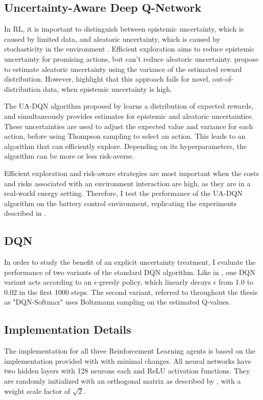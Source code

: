 \subsection{Uncertainty-Aware Deep Q-Network} %
In RL, it is important to distinguish between epistemic uncertainty, which is caused by limited data, and aleatoric uncertainty, which is caused by stochasticity in the environment \citep{hullermeier2021AleatoricEpistemicUncertainty}.
Efficient exploration aims to reduce epistemic uncertainty for promising actions, but can't reduce aleatoric uncertainty.
\cite{nikolov2022InformationDirectedExplorationDeep} propose to estimate aleatoric uncertainty using the variance of the estimated reward distribution.
However, \cite{chua2018DeepReinforcementLearning} highlight that this approach fails for novel, out-of-distribution data, when epistemic uncertainty is high.

The UA-DQN algorithm proposed by \cite{clements2020EstimatingRiskUncertainty} learns a distribution of expected rewards, and simultaneously provides estimates for epistemic and aleatoric uncertainties.
These uncertainties are used to adjust the expected value and variance for each action, before using Thompson sampling to select an action.
This leads to an algorithm that can efficiently explore.
Depending on its hyperparameters, the algorithm can be more or less risk-averse.

Efficient exploration and risk-aware strategies are most important when the costs and risks associated with an environment interaction are high, as they are in a real-world energy setting.
Therefore, I test the performance of the UA-DQN algorithm on the battery control environment, replicating the experiments described in \cite{clements2020EstimatingRiskUncertainty}.

\subsection{DQN}
In order to study the benefit of an explicit uncertainty treatment, I evaluate the performance of two variants of the standard DQN algorithm.
Like in \cite{clements2020EstimatingRiskUncertainty}, one DQN variant acts according to an $\epsilon$-greedy policy, which linearly decays $\epsilon$ from 1.0 to 0.02 in the first 1000 steps.
The second variant, referred to throughout the thesis as "DQN-Softmax" uses Boltzmann sampling on the estimated Q-values.

\subsection{Implementation Details}
The implementation for all three Reinforcement Learning agents is based on the implementation provided with \cite{clements2020EstimatingRiskUncertainty} with minimal changes.
All neural networks have two hidden layers with 128 neurons each and ReLU activation functions.
They are randomly initialized with an orthogonal matrix as described by \cite{saxe2014ExactSolutionsNonlinear}, with a weight scale factor of $\sqrt{2}$.

